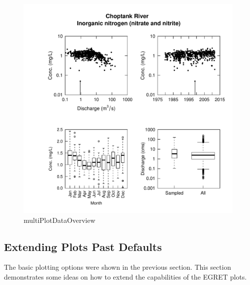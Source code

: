 \documentclass[a4paper,11pt]{article}\usepackage{graphicx, color}
\newenvironment{knitrout}{}{} %
\begin{document}
\begin{knitrout}
\color{fgcolor}\begin{figure}[]

\includegraphics[width=1\linewidth,height=1\linewidth]{figure/multiPlotDataOverview} \caption[multiPlotDataOverview]{multiPlotDataOverview\label{fig:multiPlotDataOverview}}
\end{figure}


\end{knitrout}


\FloatBarrier

\subsection{Extending Plots Past Defaults}
\label{sec:extendedPlots}
The basic plotting options were shown in the previous section.  This section demonstrates some ideas on how to extend the capabilities of the EGRET plots.
\end{document}
